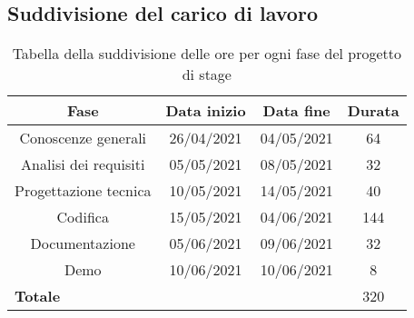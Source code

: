 	\subsection{Suddivisione del carico di lavoro}
		\begin{center}
			\begin{table}[h!]
				\centering
				\begin{tabular}{c | c | c | c} 
					\textbf{Fase} & \textbf{Data inizio} & \textbf{Data fine} & \textbf{Durata}\\
					\hline
					Conoscenze generali   & 26/04/2021 & 04/05/2021 & 64 \\
					Analisi dei requisiti       & 05/05/2021 & 08/05/2021 & 32 \\
					Progettazione tecnica & 10/05/2021 & 14/05/2021 & 40 \\
					Codifica                       & 15/05/2021 & 04/06/2021 & 144 \\
					Documentazione         & 05/06/2021 & 09/06/2021 & 32 \\
					Demo                           & 10/06/2021 & 10/06/2021 & 8 \\
					\hline\hline
					\multicolumn{3}{l}{\textbf{Totale}} & 320 \\
				\end{tabular}
				\vspace{0.3cm}
				\caption{Tabella della suddivisione delle ore per ogni fase del progetto di stage}
			\end{table}
		
		\end{center}
		